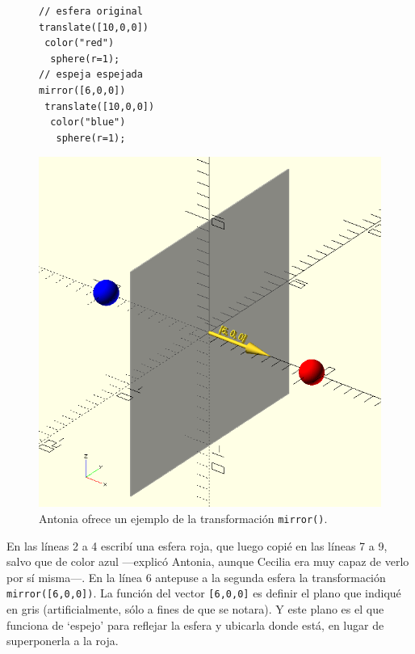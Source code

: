    \begin{figure}[ht]  
\begin{minipage}[]{.49\textwidth}     
   \begin{lstlisting}
// esfera original     
translate([10,0,0])
 color("red")
  sphere(r=1);
// espeja espejada 
mirror([6,0,0])
 translate([10,0,0])
  color("blue")
   sphere(r=1);
   \end{lstlisting}
 \end{minipage}
\begin{minipage}[]{.5\textwidth}     
 \centering
 \includegraphics[width=.9\textwidth]{imagenes/mirror-1}
\end{minipage}
\caption{Antonia ofrece un ejemplo de la transformación
        \lstinline!mirror()!.}
     \label{fig:mirror-1}
   \end{figure}
     

  
   \guillemotright En las líneas 2 a 4 escribí una esfera roja, que
   luego copié en las líneas 7 a 9, salvo que de color azul ---explicó
   Antonia, aunque Cecilia era muy capaz de verlo por sí misma---.  En
   la línea 6 antepuse a la segunda esfera la transformación
   \lstinline!mirror([6,0,0])!. La función del vector
   \lstinline![6,0,0]! es definir el plano que indiqué en gris
   (artificialmente, sólo a fines de que se notara). Y este plano es
   el que funciona de `espejo' para reflejar la esfera y ubicarla
   donde está, en lugar de superponerla a la roja.

